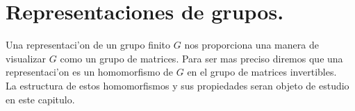 \documentclass[a4paper,openright,12pt]{report}
\numberwithin{equation}{section} %
\begin{document}
\chapter{Representaciones de grupos.}
Una representaci'on de un grupo finito $G$ nos proporciona una manera de visualizar $G$ como un grupo de matrices. Para ser mas preciso diremos que una representaci'on es un homomorfismo de $G$ en el grupo de matrices invertibles.\\
La estructura de estos homomorfismos y sus propiedades seran objeto de estudio en este capitulo.   
\end{document}
